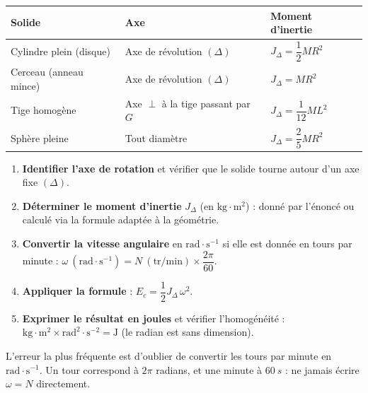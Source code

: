 \documentclass[11pt]{article}
\begin{document}
\begin{propriete}
\begin{center}
\begin{tabularx}{\linewidth}{|l|X|X|}\hline
\textbf{Solide} & \textbf{Axe} & \textbf{Moment d'inertie} \\ \hline
Cylindre plein (disque) & Axe de révolution $(\Delta)$ & $J_{\Delta} = \dfrac{1}{2}MR^2$ \\ \hline
Cerceau (anneau mince) & Axe de révolution $(\Delta)$ & $J_{\Delta} = MR^2$ \\ \hline
Tige homogène & Axe $\perp$ à la tige passant par $G$ & $J_{\Delta} = \dfrac{1}{12}ML^2$ \\ \hline
Sphère pleine & Tout diamètre & $J_{\Delta} = \dfrac{2}{5}MR^2$ \\ \hline
\end{tabularx}
\end{center}
\end{propriete}

\begin{methode}
\begin{enumerate}
\item \textbf{Identifier l'axe de rotation} et vérifier que le solide tourne autour d'un axe fixe $(\Delta)$.
\item \textbf{Déterminer le moment d'inertie} $J_{\Delta}$ (en $\mathrm{kg\cdot m^2}$) : donné par l'énoncé ou calculé via la formule adaptée à la géométrie.
\item \textbf{Convertir la vitesse angulaire} en $\mathrm{rad\cdot s^{-1}}$ si elle est donnée en tours par minute : $\omega\ (\mathrm{rad\cdot s^{-1}}) = N\ (\mathrm{tr/min}) \times \dfrac{2\pi}{60}$.
\item \textbf{Appliquer la formule} : $E_c = \dfrac{1}{2}J_{\Delta}\,\omega^2$.
\item \textbf{Exprimer le résultat en joules} et vérifier l'homogénéité : $\mathrm{kg\cdot m^2}\times\mathrm{rad^2\cdot s^{-2}} = \mathrm{J}$ (le radian est sans dimension).
\end{enumerate}
\begin{attention}
L'erreur la plus fréquente est d'oublier de convertir les tours par minute en $\mathrm{rad\cdot s^{-1}}$. Un tour correspond à $2\pi$ radians, et une minute à $\SI{60}{s}$ : ne jamais écrire $\omega = N$ directement.
\end{attention}
\end{methode}
\end{document}
